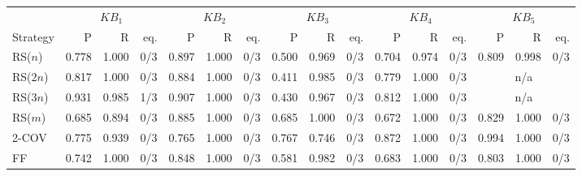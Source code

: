 \begin{tabular}{lrrrrrrrrrrrrrrr}
\toprule
 & \multicolumn{3}{c}{$KB_1$} & \multicolumn{3}{c}{$KB_2$} & \multicolumn{3}{c}{$KB_3$} & \multicolumn{3}{c}{$KB_4$} & \multicolumn{3}{c}{$KB_5$} \\
\cmidrule(lr){2-4} \cmidrule(lr){5-7} \cmidrule(lr){8-10} \cmidrule(lr){11-13} \cmidrule(lr){14-16}
Strategy & P & R & eq. & P & R & eq. & P & R & eq. & P & R & eq. & P & R & eq. \\
\midrule
RS($n$) & 0.778 & 1.000 & 0/3 & 0.897 & 1.000 & 0/3 & 0.500 & 0.969 & 0/3 & 0.704 & 0.974 & 0/3 & 0.809 & 0.998 & 0/3 \\
RS($2n$) & 0.817 & 1.000 & 0/3 & 0.884 & 1.000 & 0/3 & 0.411 & 0.985 & 0/3 & 0.779 & 1.000 & 0/3 & \multicolumn{3}{c}{n/a} \\
RS($3n$) & 0.931 & 0.985 & 1/3 & 0.907 & 1.000 & 0/3 & 0.430 & 0.967 & 0/3 & 0.812 & 1.000 & 0/3 & \multicolumn{3}{c}{n/a} \\
RS($m$) & 0.685 & 0.894 & 0/3 & 0.885 & 1.000 & 0/3 & 0.685 & 1.000 & 0/3 & 0.672 & 1.000 & 0/3 & 0.829 & 1.000 & 0/3 \\
2-COV & 0.775 & 0.939 & 0/3 & 0.765 & 1.000 & 0/3 & 0.767 & 0.746 & 0/3 & 0.872 & 1.000 & 0/3 & 0.994 & 1.000 & 0/3 \\
FF & 0.742 & 1.000 & 0/3 & 0.848 & 1.000 & 0/3 & 0.581 & 0.982 & 0/3 & 0.683 & 1.000 & 0/3 & 0.803 & 1.000 & 0/3 \\
\bottomrule
\end{tabular}
